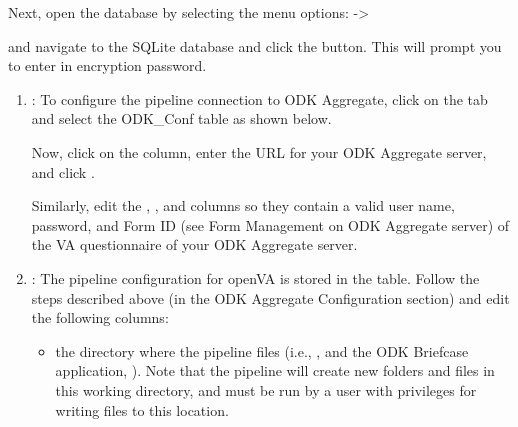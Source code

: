 \documentclass[letterpaper,12pt,english]{sphinxmanual}
\begin{document}
\begin{enumerate}
\begin{quote}
\noindent{}
\end{quote}

Next, open the database by selecting the menu options:  -\textgreater{} 
\begin{quote}

\noindent{}
\end{quote}

and navigate to the  SQLite database and click the  button.  This will prompt you to enter in encryption password.
\begin{quote}

\noindent{}
\end{quote}
\begin{enumerate}
\item {} 
: To configure the pipeline connection to ODK Aggregate, click on the  tab and select the
ODK\_Conf table as shown below.
\begin{quote}

\noindent{}

\noindent{}
\end{quote}

Now, click on the  column, enter the URL for your ODK Aggregate server, and click .
\begin{quote}

\noindent{}
\end{quote}

Similarly, edit the , , and  columns so they contain a valid user name, password, and Form ID
(see Form Management on ODK Aggregate server) of the VA questionnaire of your ODK Aggregate server.

\item {} 
: The pipeline configuration for openVA is stored in the  table. Follow the steps described
above (in the ODK Aggregate Configuration section) and edit the following columns:
\begin{itemize}
\item {} 
 \textendash{} the directory where the pipeline files (i.e., ,  and the ODK Briefcase
application, ).  Note that the pipeline will create new folders and files in this working directory,
and must be run by a user with privileges for writing files to this location.


\end{itemize}
\end{enumerate}
\end{enumerate}
\end{document}
